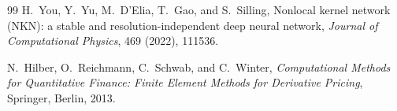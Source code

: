 \documentclass[11pt]{amsart}
\theoremstyle{remark}
\begin{document}
\begin{thebibliography}{99}
H.~You, Y.~Yu, M.~D'Elia, T.~Gao, and S.~Silling,
\newblock Nonlocal kernel network (NKN): a stable and resolution-independent
deep neural network,
\newblock \emph{Journal of Computational Physics}, 469 (2022), 111536.

N.~Hilber, O.~Reichmann, C.~Schwab, and C.~Winter,
\newblock \emph{Computational Methods for Quantitative Finance: Finite Element
Methods for Derivative Pricing},
\newblock Springer, Berlin, 2013.

\end{thebibliography}
\end{document}
